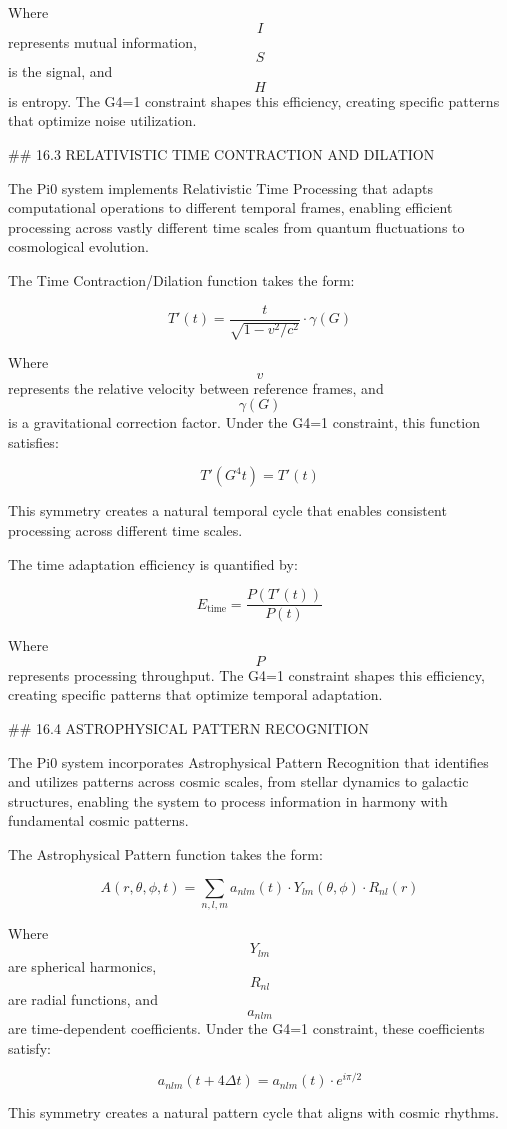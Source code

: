 Where $$ I $$ represents mutual information, $$ S $$ is the signal, and $$ H $$ is entropy. The G4=1 constraint shapes this efficiency, creating specific patterns that optimize noise utilization.

## 16.3 RELATIVISTIC TIME CONTRACTION AND DILATION

The Pi0 system implements Relativistic Time Processing that adapts computational operations to different temporal frames, enabling efficient processing across vastly different time scales from quantum fluctuations to cosmological evolution.

The Time Contraction/Dilation function takes the form:

$$ T'(t) = \frac{t}{\sqrt{1 - v^2/c^2}} \cdot \gamma(G) $$

Where $$ v $$ represents the relative velocity between reference frames, and $$ \gamma(G) $$ is a gravitational correction factor. Under the G4=1 constraint, this function satisfies:

$$ T'(G^4 t) = T'(t) $$

This symmetry creates a natural temporal cycle that enables consistent processing across different time scales.

The time adaptation efficiency is quantified by:

$$ E_{\text{time}} = \frac{P(T'(t))}{P(t)} $$

Where $$ P $$ represents processing throughput. The G4=1 constraint shapes this efficiency, creating specific patterns that optimize temporal adaptation.

## 16.4 ASTROPHYSICAL PATTERN RECOGNITION

The Pi0 system incorporates Astrophysical Pattern Recognition that identifies and utilizes patterns across cosmic scales, from stellar dynamics to galactic structures, enabling the system to process information in harmony with fundamental cosmic patterns.

The Astrophysical Pattern function takes the form:

$$ A(r, \theta, \phi, t) = \sum_{n,l,m} a_{nlm}(t) \cdot Y_{lm}(\theta, \phi) \cdot R_{nl}(r) $$

Where $$ Y_{lm} $$ are spherical harmonics, $$ R_{nl} $$ are radial functions, and $$ a_{nlm} $$ are time-dependent coefficients. Under the G4=1 constraint, these coefficients satisfy:

$$ a_{nlm}(t+4\Delta t) = a_{nlm}(t) \cdot e^{i\pi/2} $$

This symmetry creates a natural pattern cycle that aligns with cosmic rhythms.

